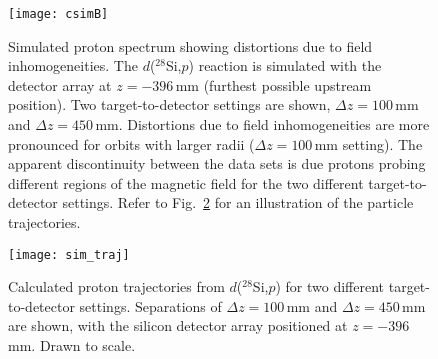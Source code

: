 \begin{figure}
\centering
\texttt{[image: csimB]}%
\caption[Simulated proton spectrum showing distortions due to field inhomogeneities]{Simulated proton spectrum showing distortions due to field inhomogeneities.  The $d$($^{28}$Si,$p$) reaction is simulated with the detector array at $z=-396$\,mm (furthest possible upstream position).  Two target-to-detector settings are shown, $\Delta z=100$\,mm and $\Delta z=450$\,mm.  Distortions due to field inhomogeneities are more pronounced for orbits with larger radii ($\Delta z=100$\,mm setting).  The apparent discontinuity between the data sets is due protons probing different regions of the magnetic field for the two different target-to-detector settings.  Refer to Fig.~\ref{sim_traj} for an illustration of the particle trajectories.}%
\label{sim_bad}%
\end{figure}

\begin{figure}%
\centering
\texttt{[image: sim\_traj]}%
\caption[Calculated proton trajectories from $d$($^{28}$Si,$p$) for two different target-to-detector settings]{Calculated proton trajectories from $d$($^{28}$Si,$p$)  for two different target-to-detector settings.  Separations of $\Delta z=100$\,mm and $\Delta z=450$\,mm are shown, with the silicon detector array positioned at $z=-396$\,mm.  Drawn to scale.}
\label{sim_traj}%
\end{figure}